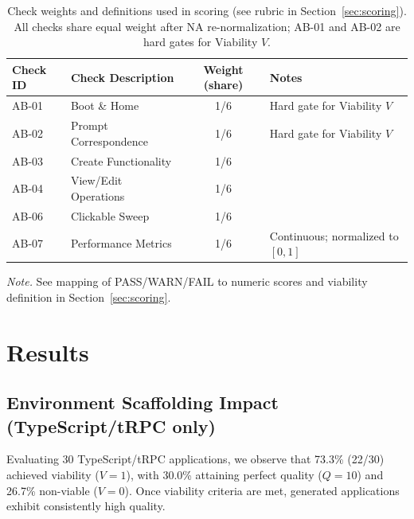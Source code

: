 \documentclass{article}
\begin{document}
\begin{table}[t]
\caption{Check weights and definitions used in scoring (see rubric in Section~\ref{sec:scoring}). All checks share equal weight after NA re-normalization; AB-01 and AB-02 are hard gates for Viability $V$.}
\label{tab:check-weights}
\centering
\begin{threeparttable}
\begin{tabular}{llcl}
\toprule
Check ID & Check Description & Weight (share) & Notes \\
\midrule
AB-01 & Boot \& Home & 1/6 & Hard gate for Viability $V$ \\
AB-02 & Prompt Correspondence & 1/6 & Hard gate for Viability $V$ \\
AB-03 & Create Functionality & 1/6 &  \\
AB-04 & View/Edit Operations & 1/6 &  \\
AB-06 & Clickable Sweep & 1/6 &  \\
AB-07 & Performance Metrics & 1/6 & Continuous; normalized to $[0,1]$ \\
\bottomrule
\end{tabular}
\begin{tablenotes}
\item \textit{Note.} See mapping of PASS/WARN/FAIL to numeric scores and viability definition in Section~\ref{sec:scoring}.
\end{tablenotes}
\end{threeparttable}
\end{table}

\section{Results}
\label{sec:results}

\subsection{Environment Scaffolding Impact (TypeScript/tRPC only)}

Evaluating 30 TypeScript/tRPC applications, we observe that 73.3\% (22/30) achieved viability ($V=1$), with 30.0\% attaining perfect quality ($Q=10$) and 26.7\% non-viable ($V=0$). Once viability criteria are met, generated applications exhibit consistently high quality.
\end{document}
